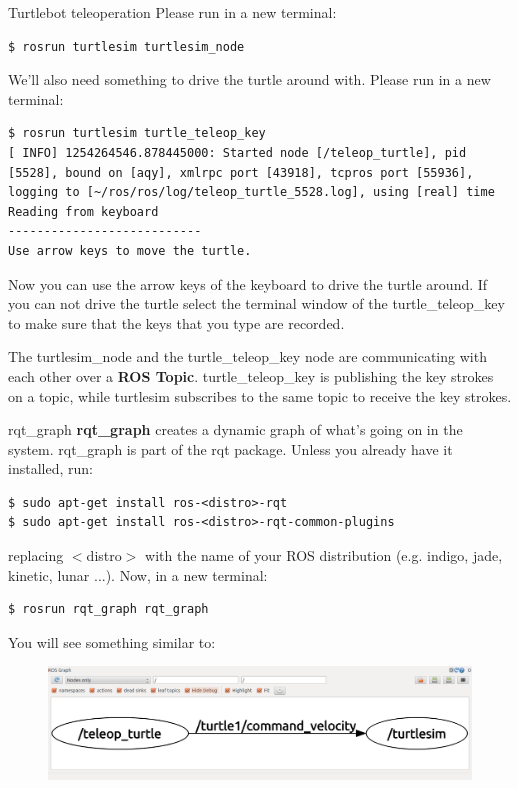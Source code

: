 \begin{frame}[fragile]{Turtlebot teleoperation}
Please run in a new terminal:
\begin{lstlisting}[language=shell]
$ rosrun turtlesim turtlesim_node
\end{lstlisting}

We'll also need something to drive the turtle around with. Please run in a new terminal:
\begin{lstlisting}[language=shell]
$ rosrun turtlesim turtle_teleop_key
[ INFO] 1254264546.878445000: Started node [/teleop_turtle], pid [5528], bound on [aqy], xmlrpc port [43918], tcpros port [55936], logging to [~/ros/ros/log/teleop_turtle_5528.log], using [real] time
Reading from keyboard
---------------------------
Use arrow keys to move the turtle.
\end{lstlisting}
Now you can use the arrow keys of the keyboard to drive the turtle around. If you can not drive the turtle select the terminal window of the turtle\_teleop\_key to make sure that the keys that you type are recorded.

\vspace{.1cm}
The turtlesim\_node and the turtle\_teleop\_key node are communicating with each other over a \textbf{ROS Topic}. turtle\_teleop\_key is publishing the key strokes on a topic, while turtlesim subscribes to the same topic to receive the key strokes.
\end{frame}

\begin{frame}[fragile]{rqt\_graph}
\textbf{rqt\_graph} creates a dynamic graph of what's going on in the system. rqt\_graph is part of the rqt package. Unless you already have it installed, run:
\begin{lstlisting}[language=shell]
$ sudo apt-get install ros-<distro>-rqt
$ sudo apt-get install ros-<distro>-rqt-common-plugins
\end{lstlisting}
replacing $<$distro$>$ with the name of your ROS distribution (e.g. indigo, jade, kinetic, lunar ...). Now, in a new terminal:
\begin{lstlisting}[language=shell]
$ rosrun rqt_graph rqt_graph
\end{lstlisting}
You will see something similar to:
\begin{figure}
\includegraphics[width=.85\textwidth]{./img/ros/rqt_graph_1.png}
\end{figure}
\end{frame}

